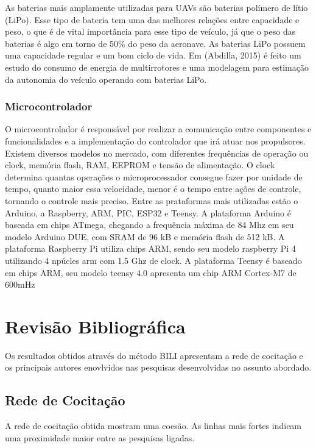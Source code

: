 As baterias mais amplamente utilizadas para UAVs são baterias polímero de lítio (LiPo). Esse tipo de bateria tem uma das melhores relações entre capacidade e peso, o que é de vital importância para esse tipo de veículo, já que o peso das baterias é algo em torno de 50\% do peso da aeronave. As baterias LiPo possuem uma capacidade regular e um bom ciclo de vida. Em (Abdilla, 2015) é feito um estudo do consumo de energia de multirrotores e uma modelagem para estimação da autonomia do veículo operando com baterias LiPo.  

\subsubsection{Microcontrolador}

O microcontrolador é responsável por realizar a comunicação entre componentes e funcionalidades e a implementação do controlador que irá atuar nos propulsores. Existem diversos modelos no mercado, com diferentes frequências de operação ou clock, memória flash, RAM, EEPROM e tensão de alimentação. O clock determina quantas operações o microprocessador consegue fazer por unidade de tempo, quanto maior essa velocidade, menor é o tempo entre ações de controle, tornando o controle mais preciso. Entre as prataformas mais utilizadas estão o Arduino, a Raspberry, ARM, PIC, ESP32 e Teensy. A plataforma Arduino é baseada em chips ATmega, chegando a frequência máxima de 84 Mhz em seu modelo Arduino DUE, com SRAM de 96 kB e memória flash de 512 kB. A plataforma Raspberry Pi utiliza chips ARM, sendo seu modelo raspberry Pi 4 utilizando 4 npúcles arm com 1.5 Ghz de clock. A plataforma Teensy é baseado em chips ARM, seu modelo teensy 4.0 apresenta um chip ARM Cortex-M7 de 600mHz

\section{Revisão Bibliográfica}

Os resultados obtidos através do método BILI apresentam a rede de cocitação e os principais autores enovlvidos nas pesquisas desenvolvidas no assunto abordado.

\subsection{Rede de Cocitação}

A rede de cocitação obtida mostram uma coesão. As linhas mais fortes indicam uma proximidade maior entre as pesquisas ligadas. 

